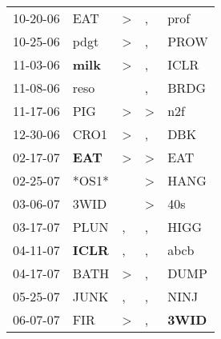 \begin{supertabular}{p{0.07\textwidth}p{0.06\textwidth}p{0.02\textwidth}p{0.02\textwidth}p{0.06\textwidth}}
          10-20-06\textsuperscript{} &            EAT\textsuperscript{} &     \textgreater &                , &           prof\textsuperscript{} \\
          10-25-06\textsuperscript{} &           pdgt\textsuperscript{} &     \textgreater &                , &           PROW\textsuperscript{} \\
          11-03-06\textsuperscript{} &  \textbf{milk\textsuperscript{}} &     \textgreater &                , &           ICLR\textsuperscript{} \\
          11-08-06\textsuperscript{} &           reso\textsuperscript{} &                  &                , &           BRDG\textsuperscript{} \\
          11-17-06\textsuperscript{} &            PIG\textsuperscript{} &     \textgreater &     \textgreater &            n2f\textsuperscript{} \\
          12-30-06\textsuperscript{} &           CRO1\textsuperscript{} &     \textgreater &                , &            DBK\textsuperscript{} \\
          02-17-07\textsuperscript{} &   \textbf{EAT\textsuperscript{}} &     \textgreater &     \textgreater &            EAT\textsuperscript{} \\
          02-25-07\textsuperscript{} &                            *OS1* &                  &     \textgreater &           HANG\textsuperscript{} \\
          03-06-07\textsuperscript{} &           3WID\textsuperscript{} &                  &     \textgreater &            40s\textsuperscript{} \\
          03-17-07\textsuperscript{} &           PLUN\textsuperscript{} &                , &                , &           HIGG\textsuperscript{} \\
          04-11-07\textsuperscript{} &  \textbf{ICLR\textsuperscript{}} &                , &                , &           abcb\textsuperscript{} \\
          04-17-07\textsuperscript{} &           BATH\textsuperscript{} &     \textgreater &                , &           DUMP\textsuperscript{} \\
          05-25-07\textsuperscript{} &           JUNK\textsuperscript{} &                , &                , &           NINJ\textsuperscript{} \\
          06-07-07\textsuperscript{} &            FIR\textsuperscript{} &     \textgreater &                , &  \textbf{3WID\textsuperscript{}} \\

\end{supertabular}
